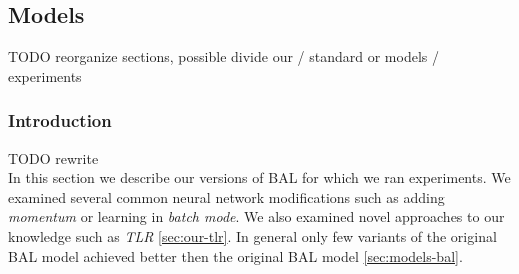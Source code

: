 \subsection{Models}
\label{sec:our-models} 
TODO reorganize sections, possible divide our / standard or models / experiments\\ 

\subsubsection*{Introduction} 
TODO rewrite  \\
In this section we describe our versions of BAL for which we ran experiments. We examined several common neural network modifications such as adding \emph{momentum} or learning in \emph{batch mode}. We also examined novel approaches to our knowledge such as \emph{TLR} \ref{sec:our-tlr}. In general only few variants of the original BAL model achieved better then the original BAL model \ref{sec:models-bal}. 


 

 



 

